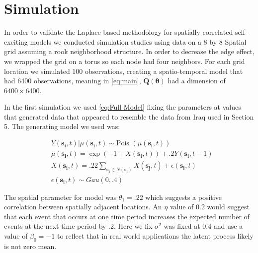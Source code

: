 \documentclass[11pt]{isuthesis}
\begin{document}
\section{Simulation}

In order to validate the Laplace based methodology for spatially correlated self-exciting models we conducted simulation studies using data on a 8 by 8 Spatial grid assuming a rook neighborhood structure.  In order to decrease the edge effect, we wrapped the grid on a torus so each node had four neighbors.  For each grid location we simulated 100 observations, creating a spatio-temporal model that had 6400 observations, meaning in \eqref{eq:main}, $\boldsymbol{Q}(\boldsymbol{\theta})$ had a dimension of $6400 \times 6400$.

In the first simulation we used \eqref{eq:Full Model} fixing the parameters at values that generated data that appeared to resemble the data from Iraq used in Section 5.  The generating model we used was:

\begin{align}
& Y(\boldsymbol{s_i},t)|\mu(\boldsymbol{s_i},t) \sim \text{Pois }(\mu(\boldsymbol{s_i},t)) \label{eq:First Simulation}\\
& \mu(\boldsymbol{s_i},t) = \exp(-1+X(\boldsymbol{s_i},t)) + .2 Y(\boldsymbol{s_i},t-1) \nonumber \\
& X(\boldsymbol{s_i},t) = .22 \sum_{\boldsymbol{s_j}\in N(\boldsymbol{s_i})}X(\boldsymbol{s_j},t) + \epsilon(\boldsymbol{s_i},t) \nonumber\\
&\epsilon(\boldsymbol{s_i},t) \sim Gau(0,.4) \nonumber
\end{align}

The spatial parameter for model was $\theta_1=.22$ which suggests a positive correlation between spatially adjacent locations.  An $\eta$ value of 0.2 would suggest that each event that occurs at one time period increases the expected number of events at the next time period by .2.  Here we fix $\sigma^2$ was fixed at 0.4 and use a value of $\beta_0=-1$  to reflect that in real world applications the latent process likely is not zero mean.
\end{document}
